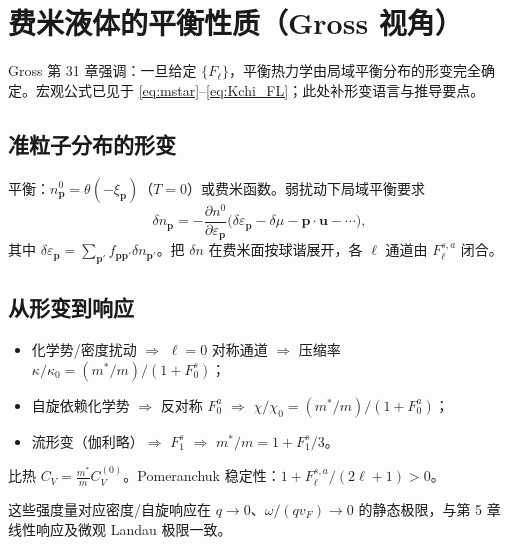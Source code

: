 \section{费米液体的平衡性质（Gross 视角）}

Gross 第 31 章强调：一旦给定 $\{F_\ell\}$，平衡热力学由局域平衡分布的形变完全确定。宏观公式已见于 \eqref{eq:mstar}--\eqref{eq:Kchi_FL}；此处补形变语言与推导要点。

\subsection{准粒子分布的形变}

平衡：$n_{\mathbf{p}}^0=\theta(-\xi_{\mathbf{p}})$（$T=0$）或费米函数。弱扰动下局域平衡要求
\begin{equation}
  \delta n_{\mathbf{p}}
  =-\frac{\partial n^0}{\partial\varepsilon_{\mathbf{p}}}
  \bigl(
  \delta\varepsilon_{\mathbf{p}}-\delta\mu-\mathbf{p}\cdot\mathbf{u}-\cdots
  \bigr),
\end{equation}
其中 $\delta\varepsilon_{\mathbf{p}}=\sum_{\mathbf{p}'}f_{\mathbf{p}\mathbf{p}'}\delta n_{\mathbf{p}'}$。把 $\delta n$ 在费米面按球谐展开，各 $\ell$ 通道由 $F_\ell^{s,a}$ 闭合。

\subsection{从形变到响应}

\begin{itemize}
  \item 化学势/密度扰动 $\Rightarrow$ $\ell=0$ 对称通道 $\Rightarrow$ 压缩率 $\kappa/\kappa_0=(m^*/m)/(1+F_0^s)$；
  \item 自旋依赖化学势 $\Rightarrow$ 反对称 $F_0^a$ $\Rightarrow$ $\chi/\chi_0=(m^*/m)/(1+F_0^a)$；
  \item 流形变（伽利略）$\Rightarrow$ $F_1^s$ $\Rightarrow$ $m^*/m=1+F_1^s/3$。
\end{itemize}
比热 $C_V=\frac{m^*}{m}C_V^{(0)}$。Pomeranchuk 稳定性：$1+F_\ell^{s,a}/(2\ell+1)>0$。

\begin{note}
这些强度量对应密度/自旋响应在 $q\to0$、$\omega/(qv_F)\to0$ 的静态极限，与第 5 章线性响应及微观 Landau 极限一致。
\end{note}
